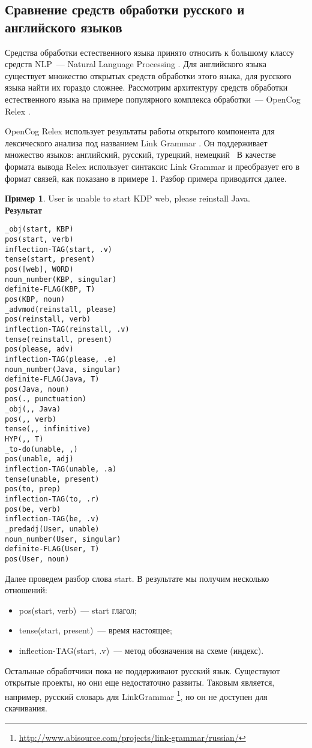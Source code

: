 \subsection{Сравнение средств обработки русского и английского языков} \label{sect2_3}
Средства обработки естественного языка принято относить к большому классу средств NLP~--- Natural Language Processing \cite{NLP}. Для английского языка существует множество открытых средств обработки этого языка, для русского языка найти их гораздо сложнее. Рассмотрим архитектуру средств обработки естественного языка на примере популярного комплекса обработки~--- OpenCog Relex \cite{OpenCogRelex}. \par
OpenCog Relex использует результаты работы открытого компонента для лексического анализа под названием Link Grammar \cite{linkgrammar}. Он поддерживает множество языков: английский, русский, турецкий, немецкий \etc\  В качестве формата вывода Relex использует синтаксис Link Grammar и преобразует его в формат связей, как показано в примере 1. Разбор примера приводится далее. 

\textbf{Пример 1}. User is unable to start KDP web, please reinstall Java.\\
\textbf{Результат} 
\begin{lstlisting}
_obj(start, KBP)
pos(start, verb)
inflection-TAG(start, .v)
tense(start, present)
pos([web], WORD)
noun_number(KBP, singular)
definite-FLAG(KBP, T)
pos(KBP, noun)
_advmod(reinstall, please)
pos(reinstall, verb)
inflection-TAG(reinstall, .v)
tense(reinstall, present)
pos(please, adv)
inflection-TAG(please, .e)
noun_number(Java, singular)
definite-FLAG(Java, T)
pos(Java, noun)
pos(., punctuation)
_obj(,, Java)
pos(,, verb)
tense(,, infinitive)
HYP(,, T)
_to-do(unable, ,)
pos(unable, adj)
inflection-TAG(unable, .a)
tense(unable, present)
pos(to, prep)
inflection-TAG(to, .r)
pos(be, verb)
inflection-TAG(be, .v)
_predadj(User, unable)
noun_number(User, singular)
definite-FLAG(User, T)
pos(User, noun)
\end{lstlisting}




Далее проведем разбор слова start. В результате мы получим несколько отношений:
\begin{itemize}
	\item pos(start, verb)~--- start глагол;
	\item tense(start, present)~--- время настоящее;
	\item inflection-TAG(start, .v)~--- метод обозначения на схеме (индекс).
\end{itemize} \par
Остальные обработчики пока не поддерживают русский язык. Существуют открытые проекты, но они еще недостаточно развиты. Таковым является, например, русский словарь для LinkGrammar \footnote{\url{http://www.abisource.com/projects/link-grammar/russian/}}, но он не доступен для скачивания. 




